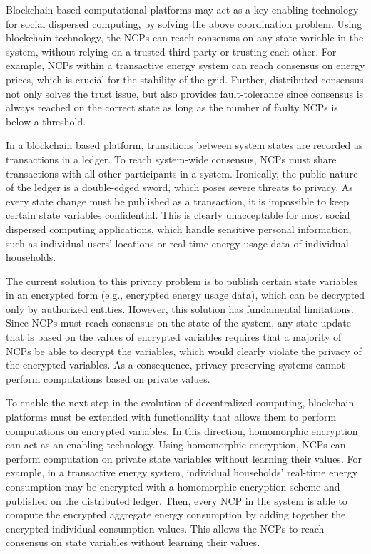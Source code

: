 \documentclass[12pt,letterpaper]{article}
\begin{document}
Blockchain based computational platforms may act as a key enabling technology for social dispersed computing, by solving the above coordination problem.
Using blockchain technology, the NCPs can reach consensus on any state variable in the system, without relying on a trusted third party or trusting each other.
For example, NCPs within a transactive energy system can reach consensus on energy prices, which is crucial for the stability of the grid.
Further, distributed consensus not only solves the trust issue, but also provides fault-tolerance since consensus is always reached on the correct state as long as the number of faulty NCPs is below a threshold.

In a blockchain based platform, transitions between system states are recorded as transactions in a ledger.
To reach system-wide consensus, NCPs must share transactions with all other participants in a system.
Ironically, the public nature of the ledger is a double-edged sword, which poses severe threats to privacy.
As every state change must be published as a transaction, it is impossible to keep certain state variables confidential.
This is clearly unacceptable for most social dispersed computing applications, which handle sensitive personal information, such as individual users' locations or real-time energy usage data of individual households.

The current solution to this privacy problem is to publish certain state variables in an encrypted form (e.g., encrypted energy usage data), which can be decrypted only by authorized entities.
However, this solution has fundamental limitations.
Since NCPs must reach consensus on the state of the system, any state update that is based on the values of encrypted variables requires that a majority of NCPs be able to decrypt the variables, which would clearly violate the privacy of the encrypted variables.
As a consequence, privacy-preserving systems cannot perform computations based on private values.

To enable the next step in the evolution of decentralized computing, blockchain platforms must be extended with functionality that allows them to perform computations on encrypted variables.
In this direction, homomorphic encryption can act as an enabling technology.
Using homomorphic encryption, NCPs can perform computation on private state variables without learning their values.
For example, in a transactive energy system, individual households' real-time energy consumption may be encrypted with a homomorphic encryption scheme and published on the distributed ledger.
Then, every NCP in the system is able to compute the encrypted aggregate energy consumption by adding together the encrypted individual consumption values.
This allows the NCPs to reach consensus on state variables without learning their values.


\clearpage


\end{document}
